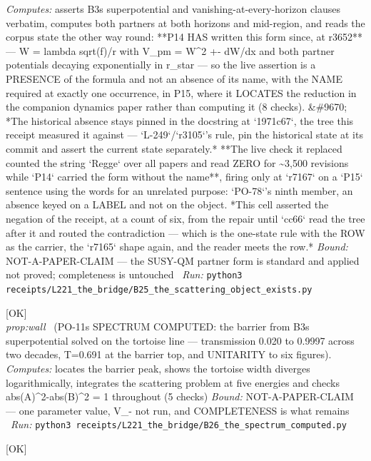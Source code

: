 \begin{description}
\emph{Computes:} asserts B3s superpotential and vanishing-at-every-horizon clauses verbatim, computes both partners at both horizons and mid-region, and reads the corpus state the other way round: **P14 HAS written this form since, at r3652** --- W = lambda sqrt(f)/r with V\_pm = W\textasciicircum{}2 +- dW/dx and both partner potentials decaying exponentially in r\_star --- so the live assertion is a PRESENCE of the formula and not an absence of its name, with the NAME required at exactly one occurrence, in P15, where it LOCATES the reduction in the companion dynamics paper rather than computing it (8 checks). \&\#9670;  *The historical absence stays pinned in the docstring at `1971c67`, the tree this receipt measured it against --- `L-249`/`r3105`'s rule, pin the historical state at its commit and assert the current state separately.*  **The live check it replaced counted the string `Regge` over all papers and read ZERO for \textasciitilde{}3,500 revisions while `P14` carried the form without the name**, firing only at `r7167` on a `P15` sentence using the words for an unrelated purpose: `PO-78`'s ninth member, an absence keyed on a LABEL and not on the object.  *This cell asserted the negation of the receipt, at a count of six, from the repair until `cc66` read the tree after it and routed the contradiction --- which is the one-state rule with the ROW as the carrier, the `r7165` shape again, and the reader meets the row.*
 \emph{Bound:} NOT-A-PAPER-CLAIM --- the SUSY-QM partner form is standard and applied not proved; completeness is untouched
\ \emph{Run:} \texttt{python3 receipts/L221\_the\_bridge/B25\_the\_scattering\_object\_exists.py}
\item[\label{rcpt:B26_the_spectrum_computed}\textbf{}\quad\texttt{B26\_the\_spectrum\_computed}]\hfill\textsf{[OK]}\\
\textit{prop:wall} \ (PO-11s SPECTRUM COMPUTED: the barrier from B3s superpotential solved on the tortoise line --- transmission 0.020 to 0.9997 across two decades, T=0.691 at the barrier top, and UNITARITY to six figures). 
\emph{Computes:} locates the barrier peak, shows the tortoise width diverges logarithmically, integrates the scattering problem at five energies and checks abs(A)\textasciicircum{}2-abs(B)\textasciicircum{}2 = 1 throughout (5 checks)
 \emph{Bound:} NOT-A-PAPER-CLAIM --- one parameter value, V\_- not run, and COMPLETENESS is what remains
\ \emph{Run:} \texttt{python3 receipts/L221\_the\_bridge/B26\_the\_spectrum\_computed.py}
\item[\label{rcpt:B27_completeness_follows}\textbf{}\quad\texttt{B27\_completeness\_follows}]\hfill\textsf{[OK]}\\

\end{description}
